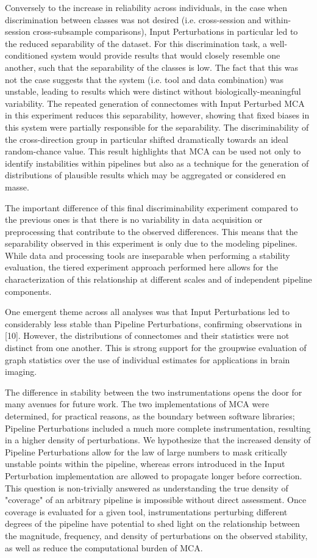 \documentclass[fleqn,10pt]{SelfArx} %
\begin{document}
Conversely to the increase in reliability across individuals, in the case when discrimination between classes was not desired (i.e. cross-session and within-session cross-subsample  comparisons), Input Perturbations in particular led to the reduced separability of the dataset. For this discrimination task, a well-conditioned system would provide results that would closely resemble one another, such that the separability of the classes is low. The fact that this was not the case suggests that the system (i.e. tool and data combination) was unstable, leading to results which were distinct without biologically-meaningful variability. The repeated generation of connectomes with Input Perturbed MCA in this experiment reduces this separability, however, showing that fixed biases in this system were partially responsible for the separability. The discriminability of the cross-direction group in particular shifted dramatically towards an ideal random-chance value. This result highlights that MCA can be used not only to identify instabilities within pipelines but also as a technique for the generation of distributions of plausible results which may be aggregated or considered en masse.

The important difference of this final discriminability experiment compared to the previous ones is that there is no variability in data acquisition or preprocessing that contribute to the observed differences. This means that the separability observed in this experiment is only due to the modeling pipelines. While data and processing tools are inseparable when performing a stability evaluation, the tiered experiment approach performed here allows for the characterization of this relationship at different scales and of independent pipeline components.

One emergent theme across all analyses was that Input Perturbations led to considerably less stable than Pipeline Perturbations, confirming observations in [10]. However, the distributions of connectomes and their statistics were not distinct from one another. This is strong support for the groupwise evaluation of graph statistics over the use of individual estimates for applications in brain imaging.

The difference in stability between the two instrumentations opens the door for many avenues for future work. The two implementations of MCA were determined, for practical reasons, as the boundary between software libraries; Pipeline Perturbations included a much more complete instrumentation, resulting in a higher density of perturbations. We hypothesize that the increased density of Pipeline Perturbations allow for the law of large numbers to mask critically unstable points within the pipeline, whereas errors introduced in the Input Perturbation implementation are allowed to propagate longer before correction. This question is non-trivially answered as understanding the true density of "coverage" of an arbitrary pipeline is impossible without direct assessment. Once coverage is evaluated for a given tool, instrumentations perturbing different degrees of the pipeline have potential to shed light on the relationship between the magnitude, frequency, and density of perturbations on the observed stability, as well as reduce the computational burden of MCA.
\end{document}
